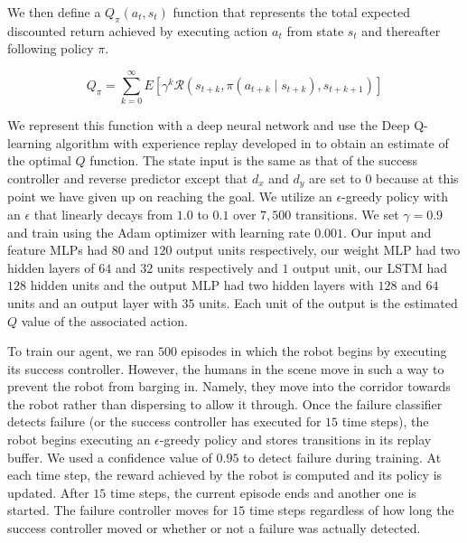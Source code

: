 \documentclass[letterpaper, 10 pt, conference]{ieeeconf}  %
\begin{document}
		We then define a $Q_{\pi}(a_t, s_t)$ function that represents the total expected discounted return achieved by executing action $a_t$ from state $s_t$ and thereafter following policy $\pi$. 
		
		\begin{equation}\label{eq:q}
			Q_{\pi} = 
			\sum_{k=0}^{\infty}E[\gamma^k \mathcal{R}(s_{t+k}, \pi(a_{t+k} \mid s_{t+k}), s_{t+k+1})]
		\end{equation}
		
		We represent this function with a deep neural network and use the Deep Q-learning algorithm with experience replay developed in \cite{dqn} to obtain an estimate of the optimal $Q$ function. The state input is the same as that of the success controller and reverse predictor except that $d_x$ and $d_y$ are set to $0$ because at this point we have given up on reaching the goal. We utilize an $\epsilon$-greedy policy with an $\epsilon$ that linearly decays from $1.0$ to $0.1$ over $7,500$ transitions. We set $\gamma=0.9$ and train using the Adam optimizer with learning rate $0.001$. Our input and feature MLPs had $80$ and $120$ output units respectively, our weight MLP had two hidden layers of $64$ and $32$ units respectively and $1$ output unit, our LSTM had $128$ hidden units and the output MLP had two hidden layers with $128$ and $64$ units and an output layer with $35$ units. Each unit of the output is the estimated $Q$ value of the associated action.
		
		To train our agent, we ran $500$ episodes in which the robot begins by executing its success controller. However, the humans in the scene move in such a way to prevent the robot from barging in. Namely, they move into the corridor towards the robot rather than dispersing to allow it through. Once the failure classifier detects failure (or the success controller has executed for $15$ time steps), the robot begins executing an $\epsilon$-greedy policy and stores transitions in its replay buffer. We used a confidence value of $0.95$ to detect failure during training. At each time step, the reward achieved by the robot is computed and its policy is updated. After $15$ time steps, the current episode ends and another one is started. The failure controller moves for $15$ time steps regardless of how long the success controller moved or whether or not a failure was actually detected. 
		
\end{document}

